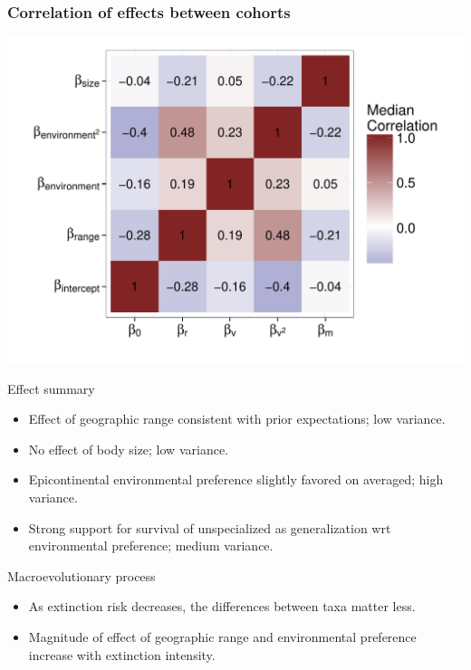 \documentclass{beamer}
\begin{document}
\begin{frame}
  \frametitle{Correlation of effects between cohorts}

  \begin{center}
    \includegraphics[width = \textwidth,height = 0.9\textheight,keepaspectratio = true]{figure/wei_cor_heatmap}
  \end{center}
\end{frame}

\begin{frame}
  \begin{block}{Effect summary}
    \begin{itemize}
      \item Effect of geographic range consistent with prior expectations; low variance.
      \item No effect of body size; low variance.
      \item Epicontinental environmental preference slightly favored on averaged; high variance. 
      \item Strong support for survival of unspecialized as generalization wrt environmental preference; medium variance.
    \end{itemize}
  \end{block}
\end{frame}

\begin{frame}
  \begin{alertblock}{Macroevolutionary process}
    \begin{itemize}
      \item As extinction risk decreases, the differences between taxa matter less.
      \item Magnitude of effect of geographic range and environmental preference increase with extinction intensity.
    \end{itemize}
  \end{alertblock}
\end{frame}
\end{document}
